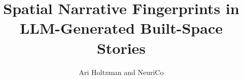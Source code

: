 \documentclass{article}
\title{Spatial Narrative Fingerprints in LLM-Generated Built-Space Stories}
\author{Ari Holtzman and NeuriCo}
\begin{document}
\maketitle

\begin{abstract}

\end{abstract}









\end{document}
